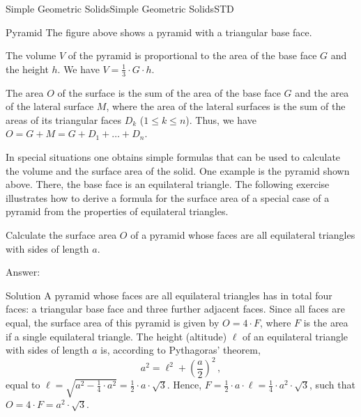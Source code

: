 \begin{MXContent}{Simple Geometric Solids}{Simple Geometric Solids}{STD}
\begin{MXInfo}{Pyramid}
The figure above shows a pyramid with a triangular base face.

The volume $V$ of the pyramid is proportional to the area of the base face 
$G$ and the height $h$. We have $V = \frac{1}{3} \cdot G \cdot h$.

The area $O$ of the surface is the sum of the area of the base face $G$ and 
the area of the lateral surface $M$, where the area of the lateral surfaces 
is the sum of the areas of its triangular faces $D_k$ ($1 \leq k \leq n$).
Thus, we have $O = G + M = G + D_1 + \ldots + D_n$.
\end{MXInfo}

In special situations one obtains simple formulas that can be used to 
calculate the volume and the surface area of the solid. One example is 
the pyramid shown above. There, the base face is an equilateral triangle. 
The following exercise illustrates how to derive a formula for the 
surface area of a special case of a pyramid from the properties of 
equilateral triangles.  

\begin{MExercise}
Calculate the surface area $O$ of a pyramid whose faces are all equilateral 
triangles with sides of length $a$.

Answer: 
{}

\begin{MHint}{Solution}
A pyramid whose faces are all equilateral triangles has in total four faces: 
a triangular base face and three further adjacent faces. Since all faces are equal,
the surface area of this pyramid is given by $O = 4 \cdot F$, where $F$ is the 
area if a single equilateral triangle. The height (altitude) $\ell$ of an equilateral
triangle with sides of length $a$ is, according to Pythagoras' theorem,
\[
a^2 = \ell^2 + \left(\frac{a}{2}\right)^2 \, , %
\]
equal to
$\ell = \sqrt{a^2 - \frac{1}{4} \cdot a^2} %
 = \frac{1}{2} \cdot a \cdot \sqrt{3}$.
Hence,
$F = \frac{1}{2} \cdot a \cdot \ell = \frac{1}{4} \cdot a^2 \cdot \sqrt{3}$, 
such that
$O = 4 \cdot F = a^2 \cdot \sqrt{3}$.%
\end{MHint}
\end{MExercise}


\end{MXContent}
